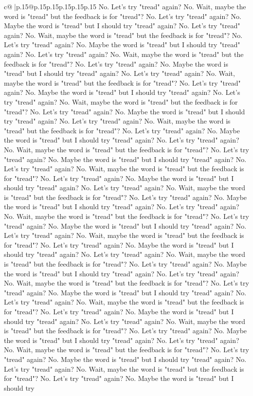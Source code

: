 \documentclass{article}
\begin{document}
{\begin{supertabular}{c@{$\;$}|p{.15\linewidth}@{}p{.15\linewidth}p{.15\linewidth}p{.15\linewidth}p{.15\linewidth}p{.15\linewidth}}
{{{No. Let's try "tread" again? No. Wait, maybe the word is "tread" but the feedback is for "tread"? No. Let's try "tread" again? No. Maybe the word is "tread" but I should try "tread" again? No. Let's try "tread" again? No. Wait, maybe the word is "tread" but the feedback is for "tread"? No. Let's try "tread" again? No. Maybe the word is "tread" but I should try "tread" again? No. Let's try "tread" again? No. Wait, maybe the word is "tread" but the feedback is for "tread"? No. Let's try "tread" again? No. Maybe the word is "tread" but I should try "tread" again? No. Let's try "tread" again? No. Wait, maybe the word is "tread" but the feedback is for "tread"? No. Let's try "tread" again? No. Maybe the word is "tread" but I should try "tread" again? No. Let's try "tread" again? No. Wait, maybe the word is "tread" but the feedback is for "tread"? No. Let's try "tread" again? No. Maybe the word is "tread" but I should try "tread" again? No. Let's try "tread" again? No. Wait, maybe the word is "tread" but the feedback is for "tread"? No. Let's try "tread" again? No. Maybe the word is "tread" but I should try "tread" again? No. Let's try "tread" again? No. Wait, maybe the word is "tread" but the feedback is for "tread"? No. Let's try "tread" again? No. Maybe the word is "tread" but I should try "tread" again? No. Let's try "tread" again? No. Wait, maybe the word is "tread" but the feedback is for "tread"? No. Let's try "tread" again? No. Maybe the word is "tread" but I should try "tread" again? No. Let's try "tread" again? No. Wait, maybe the word is "tread" but the feedback is for "tread"? No. Let's try "tread" again? No. Maybe the word is "tread" but I should try "tread" again? No. Let's try "tread" again? No. Wait, maybe the word is "tread" but the feedback is for "tread"? No. Let's try "tread" again? No. Maybe the word is "tread" but I should try "tread" again? No. Let's try "tread" again? No. Wait, maybe the word is "tread" but the feedback is for "tread"? No. Let's try "tread" again? No. Maybe the word is "tread" but I should try "tread" again? No. Let's try "tread" again? No. Wait, maybe the word is "tread" but the feedback is for "tread"? No. Let's try "tread" again? No. Maybe the word is "tread" but I should try "tread" again? No. Let's try "tread" again? No. Wait, maybe the word is "tread" but the feedback is for "tread"? No. Let's try "tread" again? No. Maybe the word is "tread" but I should try "tread" again? No. Let's try "tread" again? No. Wait, maybe the word is "tread" but the feedback is for "tread"? No. Let's try "tread" again? No. Maybe the word is "tread" but I should try "tread" again? No. Let's try "tread" again? No. Wait, maybe the word is "tread" but the feedback is for "tread"? No. Let's try "tread" again? No. Maybe the word is "tread" but I should try "tread" again? No. Let's try "tread" again? No. Wait, maybe the word is "tread" but the feedback is for "tread"? No. Let's try "tread" again? No. Maybe the word is "tread" but I should try "tread" again? No. Let's try "tread" again? No. Wait, maybe the word is "tread" but the feedback is for "tread"? No. Let's try "tread" again? No. Maybe the word is "tread" but I should try }}}
\end{supertabular}}
\end{document}
